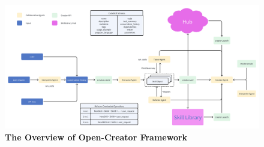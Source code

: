 \begin{figure}[t]
    \centering
    \includegraphics[width=1.1\textwidth]{figures/framework.png}
    \caption{\textbf{The Overview of Open-Creator Framework}}
    \label{fig:framework}
\end{figure}